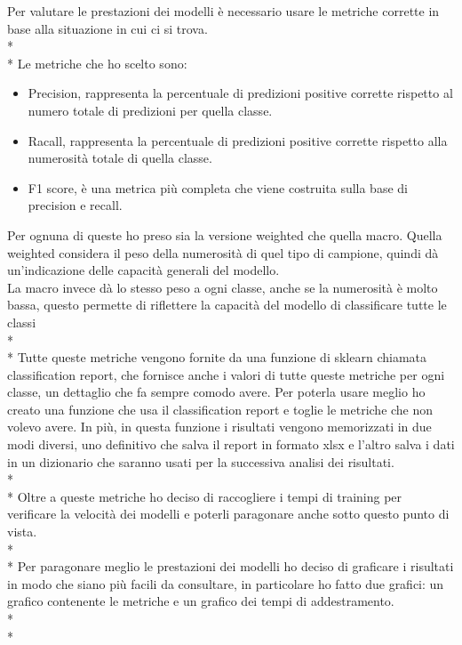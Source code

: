 Per valutare le prestazioni dei modelli è necessario usare le metriche corrette in base alla situazione in cui ci si trova.\\*\\*
Le metriche che ho scelto sono:
\begin{itemize}
	\item Precision, rappresenta la percentuale di predizioni positive corrette rispetto al numero totale di predizioni per quella classe.
	\item Racall, rappresenta la percentuale di predizioni positive corrette rispetto alla numerosità totale di quella classe.
	\item F1 score, è una metrica più completa che viene costruita sulla base di precision e recall.

\end{itemize}
Per ognuna di queste ho preso sia la versione weighted che quella macro. Quella weighted considera il peso della numerosità di quel tipo di campione, quindi dà un’indicazione delle capacità generali del modello.\\
 La macro invece dà lo stesso peso a ogni classe, anche se la numerosità è molto bassa, questo permette di riflettere la capacità del modello di classificare tutte le classi\\*\\*
 Tutte queste metriche vengono fornite da una funzione di sklearn chiamata classification report, che fornisce anche i valori di tutte queste metriche per ogni classe, un dettaglio che fa sempre comodo avere. Per poterla usare meglio ho creato una funzione che usa il classification report e toglie le metriche che non volevo avere. In più, in questa funzione i risultati vengono memorizzati in due modi diversi, uno definitivo che salva il report in formato xlsx e l’altro salva i dati in un dizionario che saranno usati per la successiva analisi dei risultati. \\*\\*
 Oltre a queste metriche ho deciso di raccogliere i tempi di training per verificare la velocità dei modelli e poterli paragonare anche sotto questo punto di vista.\\*\\*
Per paragonare meglio le prestazioni dei modelli ho deciso di graficare i risultati in modo che siano più facili da consultare, in particolare ho fatto due grafici: un grafico contenente le metriche e un grafico dei tempi di addestramento.\\*\\*

